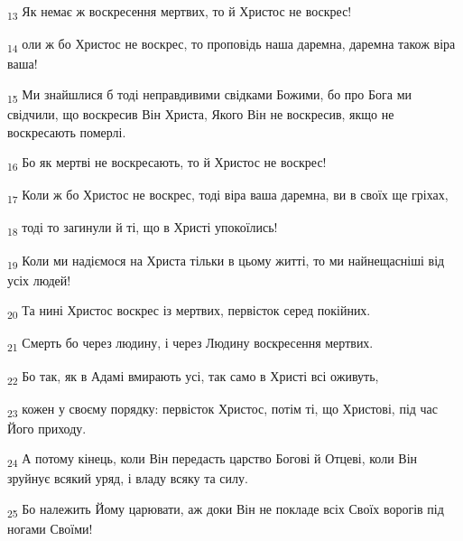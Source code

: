 \begin{tcolorbox}
\textsubscript{13} Як немає ж воскресення мертвих, то й Христос не воскрес!
\end{tcolorbox}
\begin{tcolorbox}
\textsubscript{14} оли ж бо Христос не воскрес, то проповідь наша даремна, даремна також віра ваша!
\end{tcolorbox}
\begin{tcolorbox}
\textsubscript{15} Ми знайшлися б тоді неправдивими свідками Божими, бо про Бога ми свідчили, що воскресив Він Христа, Якого Він не воскресив, якщо не воскресають померлі.
\end{tcolorbox}
\begin{tcolorbox}
\textsubscript{16} Бо як мертві не воскресають, то й Христос не воскрес!
\end{tcolorbox}
\begin{tcolorbox}
\textsubscript{17} Коли ж бо Христос не воскрес, тоді віра ваша даремна, ви в своїх ще гріхах,
\end{tcolorbox}
\begin{tcolorbox}
\textsubscript{18} тоді то загинули й ті, що в Христі упокоїлись!
\end{tcolorbox}
\begin{tcolorbox}
\textsubscript{19} Коли ми надіємося на Христа тільки в цьому житті, то ми найнещасніші від усіх людей!
\end{tcolorbox}
\begin{tcolorbox}
\textsubscript{20} Та нині Христос воскрес із мертвих, первісток серед покійних.
\end{tcolorbox}
\begin{tcolorbox}
\textsubscript{21} Смерть бо через людину, і через Людину воскресення мертвих.
\end{tcolorbox}
\begin{tcolorbox}
\textsubscript{22} Бо так, як в Адамі вмирають усі, так само в Христі всі оживуть,
\end{tcolorbox}
\begin{tcolorbox}
\textsubscript{23} кожен у своєму порядку: первісток Христос, потім ті, що Христові, під час Його приходу.
\end{tcolorbox}
\begin{tcolorbox}
\textsubscript{24} А потому кінець, коли Він передасть царство Богові й Отцеві, коли Він зруйнує всякий уряд, і владу всяку та силу.
\end{tcolorbox}
\begin{tcolorbox}
\textsubscript{25} Бо належить Йому царювати, аж доки Він не покладе всіх Своїх ворогів під ногами Своїми!
\end{tcolorbox}
